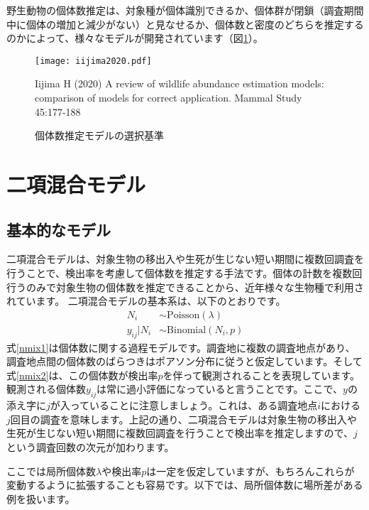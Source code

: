 野生動物の個体数推定は、対象種が個体識別できるか、個体群が閉鎖（調査期間中に個体の増加と減少がない）と見なせるか、個体数と密度のどちらを推定するのかによって、様々なモデルが開発されています（図\ref{guide_model}）。
\begin{figure}[htb]
\begin{center}
\graphicspath{{4_hm/figs/}}
\texttt{[image: iijima2020.pdf]}\\
\caption{個体数推定モデルの選択基準}
\label{guide_model}
 \begin{flushleft}
\scriptsize Iijima H (2020) A review of wildlife abundance estimation models: comparison of models for correct application. Mammal Study 45:177-188
\end{flushleft}
\end{center}
\end{figure}

\clearpage
\section{二項混合モデル}
	\subsection{基本的なモデル}
二項混合モデルは、対象生物の移出入や生死が生じない短い期間に複数回調査を行うことで、検出率を考慮して個体数を推定する手法です。個体の計数を複数回行うのみで対象生物の個体数を推定できることから、近年様々な生物種で利用されています。
二項混合モデルの基本系は、以下のとおりです。
\begin{align}
N_{i} &\sim \text{Poisson}(\lambda) \label{nmix1} \\
y_{ij} | N_{i} &\sim \text{Binomial}(N_{i}, p) \label{nmix2}
\end{align}
式\ref{nmix1}は個体数に関する過程モデルです。調査地に複数の調査地点があり、調査地点間の個体数のばらつきはポアソン分布に従うと仮定しています。そして式\ref{nmix2}は、この個体数が検出率$p$を伴って観測されることを表現しています。観測される個体数$y_{ij}$は常に過小評価になっていると言うことです。ここで、$y$の添え字に$j$が入っていることに注意しましょう。これは、ある調査地点$i$における$j$回目の調査を意味します。上記の通り、二項混合モデルは対象生物の移出入や生死が生じない短い期間に複数回調査を行うことで検出率を推定しますので、$j$という調査回数の次元が加わります。

ここでは局所個体数$\lambda$や検出率$p$は一定を仮定していますが、もちろんこれらが変動するように拡張することも容易です。以下では、局所個体数に場所差がある例を扱います。


